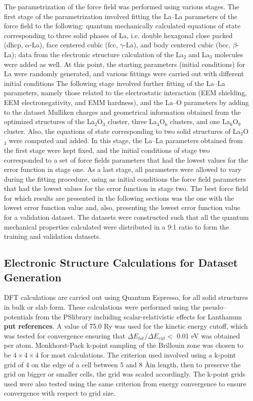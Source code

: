 \documentclass[journal=jpcafh,manuscript=article]{achemso}
\begin{document}
The parametrization of the force field was performed using various stages.
The first stage of the parametrization involved fitting the La--La parameters of the force field to the following: quantum mechanically calculated equations of state corresponding to three solid phases of La, i.e. double hexagonal close packed (dhcp, $\alpha$-La), face centered cubic (fcc, $\gamma$-La), and body centered cubic (bcc, $\beta$-La); data from the electronic structure calculation of the La$_2$ and La$_3$ molecules were added as well.
At this point, the starting parameters (initial conditions) for La were randomly generated, and various fittings were carried out with different initial conditions
The following stage involved further fitting of the La--La parameters, namely those related to the electrostatic interaction (EEM shielding, EEM electronegativity, and EMM hardness), and the La--O parameters by adding to the dataset Mulliken charges and geometrical information obtained from the optimized structures of the La$_2$O$_3$ cluster, three La$_4$O$_6$ clusters, and one La$_6$O$_9$ cluster.
Also, the equations of state corresponding to two solid structures of La$_2$O$_3$ were computed and added.
In this stage, the La--La parameters obtained from the first stage were kept fixed, and the initial conditions of stage two corresponded to a set of force fields parameters that had the lowest values for the error function in stage one.
As a last stage, all parameters were allowed to vary during the fitting procedure, using as initial conditions the force field parameters that had the lowest values for the error function in stage two.
The best force field for which results are presented in the following sections was the one with the lowest error function value and, also, presenting the lowest error function value for a validation dataset.
The datasets were constructed such that all the quantum mechanical properties calculated were distributed in a 9:1 ratio to form the training and validation datasets.


\subsection{Electronic Structure Calculations for Dataset Generation}
\label{sec:dft-details}

DFT calculations are carried out using Quantum Espresso,\cite{giannozzi_advanced_2017} for all solid structures in bulk or slab form.
These calculations were performed using the pseudo--potentials from the PSlibrary including scalar-relativistic effects for Lanthanum \textbf{put references}.
A value of 75.0 Ry was used for the kinetic energy cutoff, which was tested for convergence ensuring that $\Delta E_{tot} / \Delta E_{cut} <$ 0.01 eV was obtained per atom.
Monkhorst-Pack k-point sampling of the Brillouin zone was chosen to be $4\times4\times4$ for most calculations.
The criterion used involved using a k-point grid of 4 on the edge of a cell between 5 and 8 \AA in length, then to preserve the grid on bigger or smaller cells, the grid was scaled accordingly.
The k-point grids used were also tested using the same criterion from energy convergence to ensure convergence with respect to grid size.
\end{document}
